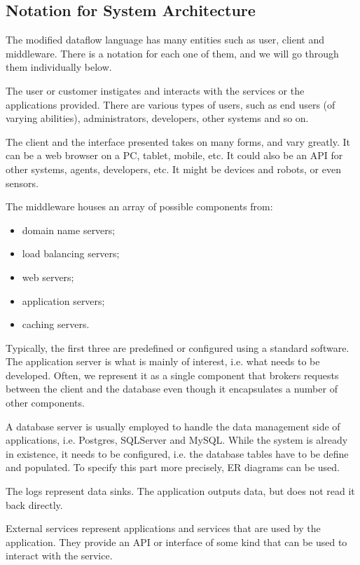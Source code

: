 \documentclass[a4paper, openany]{memoir}
\begin{document}
\subsection{Notation for System Architecture}
The modified dataflow language has many entities such as user, client and middleware. There is a notation for each one of them, and we will go through them individually below.

\noindent The user or customer instigates and interacts with the services or the applications provided. There are various types of users, such as end users (of varying abilities), administrators, developers, other systems and so on.

\noindent The client and the interface presented takes on many forms, and vary greatly. It can be a web browser on a PC, tablet, mobile, etc. It could also be an API for other systems, agents, developers, etc. It might be devices and robots, or even sensors.

\noindent The middleware houses an array of possible components from:
\begin{itemize}
    \item domain name servers;
    \item load balancing servers;
    \item web servers;
    \item application servers;
    \item caching servers.
\end{itemize}
Typically, the first three are predefined or configured using a standard software. The application server is what is mainly of interest, i.e. what needs to be developed. Often, we represent it as a single component that brokers requests between the client and the database even though it encapsulates a number of other components.

\noindent A database server is usually employed to handle the data management side of applications, i.e. Postgres, SQLServer and MySQL. While the system is already in existence, it needs to be configured, i.e. the database tables have to be define and populated. To specify this part more precisely, ER diagrams can be used.

\noindent The logs represent data sinks. The application outputs data, but does not read it back directly. 

\noindent External services represent applications and services that are used by the application. They provide an API or interface of some kind that can be used to interact with the service.
\end{document}
